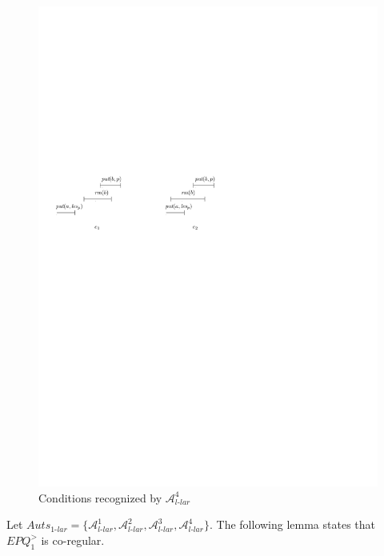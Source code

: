 \begin{figure}[htbp]
  \centering
  \includegraphics[width=0.7 \textwidth]{figures/PIC_HIS_PQ1Lar-rprp.pdf}
  \caption{Conditions recognized by $\mathcal{A}_{\textit{l-lar}}^4$}
  \label{fig:his for APQ1Lar-4}
\end{figure}

Let $\textit{Auts}_{\textit{1-lar}} = \{ \mathcal{A}_{\textit{l-lar}}^1, \mathcal{A}_{\textit{l-lar}}^2, \mathcal{A}_{\textit{l-lar}}^3, \mathcal{A}_{\textit{l-lar}}^4 \}$. The following lemma states that $\textit{EPQ}_1^{>}$ is co-regular.


\EPQOneLarisCoRegular*


